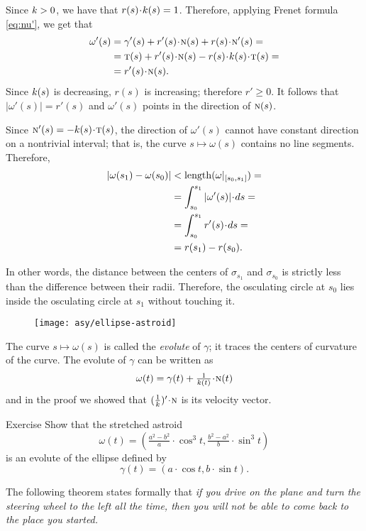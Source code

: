 Since $k>0$, we have that $r(s)\cdot\skur(s)=1$.
Therefore, applying Frenet formula \ref{eq:nu'}, we get that
\begin{align*}
\omega'(s)&=\gamma'(s)+r'(s)\cdot \norm(s)+r(s)\cdot \norm'(s)=
\\
&=\tan(s)+r'(s)\cdot \norm(s)-r(s)\cdot \skur(s)\cdot \tan(s)=
\\
&=r'(s)\cdot \norm(s).
\end{align*}
Since $k(s)$ is decreasing, $r(s)$ is increasing;
therefore $r'\ge 0$.
It follows that $|\omega'(s)|= r'(s)$ and $\omega'(s)$ points in the direction of $\text{\sc{n}}(s)$.

Since $\norm'(s)=-\skur(s)\cdot\tan(s)$, the direction of $\omega'(s)$ cannot have constant direction on a nontrivial interval;
that is, the curve $s\mapsto \omega(s)$ contains no line segments.
Therefore, 
\begin{align*}
|\omega(s_1)-\omega(s_0)|&<\length(\omega|_{[s_0,s_1]})=
\\
&=\int_{s_0}^{s_1}|\omega'(s)|\cdot ds=
\\
&=\int_{s_0}^{s_1}r'(s)\cdot ds=
\\
&=r(s_1)-r(s_0).
\end{align*}

In other words, the distance between the centers of $\sigma_{s_1}$ and $\sigma_{s_0}$
is strictly less than the difference between their radii.
Therefore, the osculating circle at $s_0$ lies inside the osculating circle at $s_1$ without touching it.
\qeds

{

\begin{wrapfigure}{r}{32 mm}
\vskip-4mm
\centering
\texttt{[image: asy/ellipse-astroid]}
\vskip-0mm
\end{wrapfigure}

The curve $s\mapsto \omega(s)$ is called the \emph{evolute} of $\gamma$; 
it traces the centers of curvature of the curve. 
The evolute of $\gamma$ can be written as 
\[\omega(t)=\gamma(t)+\tfrac1{\skur(t)}\cdot \norm(t)\] and  
in the proof we showed that $(\tfrac1{\skur})'\cdot\norm$ is its velocity vector.


\begin{thm}{Exercise}\label{ex:evolute-of-ellipse}
Show that the stretched astroid 
\[\omega(t)=(\tfrac{a^2-b^2}{a}\cdot \cos^3 t,  \tfrac{b^2-a^2}{b}\cdot\sin^3 t)\]
is an evolute of the ellipse defined by
\[\gamma(t)= (a\cdot \cos t, b\cdot\sin t).\]
\end{thm}

The following theorem states formally that 
\emph{if you drive on the plane and turn the steering wheel to the left all the time,
then you will not be able to come back to the place you started.}

}


